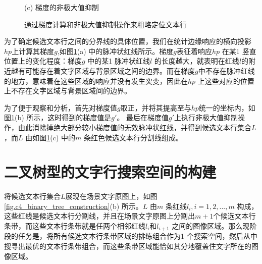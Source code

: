 \begin{figure}[!h]
\begin{minipage}[t]{0.32\linewidth}
        \centerline{\small (c) 梯度的非极大值抑制}
        \end{minipage}
        \caption{通过梯度计算和非极大值抑制操作来粗略定位文本行}
        \label{fig.c4_candidate_line_construction}
        \end{figure}

        为了确定候选文本行之间的分界线的具体位置，我们在统计边缘响应的横向投影$hp$上计算其梯度$g$,如图\ref{fig.c4_candidate_line_construction}(a) 中的脉冲状红线所示。梯度$g$表征着响应$hp$ 在某1 竖直位置上的变化程度：梯度$g$ 中的某1 脉冲状红线$l$ 的长度越大，就表明在红线$l$的附近越有可能存在着文字区域与背景区域之间的边界。而在梯度$g$中不存在脉冲红线的地方，意味着在这些区域的响应并没有发生突变，因此在$hp$ 上这些对应的位置上不存在文字区域与背景区域间的边界。

        为了便于观察和分析，首先对梯度值$g$取正，并将其提高至与$hp$统一的坐标内，如图\ref{fig.c4_candidate_line_construction}(b) 所示，这时得到的梯度值是$g$$'$。 最后在梯度值$g$$'$上执行非极大值抑制操作，由此消除掉绝大部分较小梯度值的无效脉冲状红线，并得到候选文本行集合$L$，而$L$ 由如图\ref{fig.c4_candidate_line_construction}(c) 中的$m$ 条红色候选文本行分割线组成。

    \section{二叉树型的文字行搜索空间的构建}

    将候选文本行集合$L$展现在场景文字原图上，如图\ref{fig.c4_binary_tree_construction}(b) 所示。$L$ 由$m$ 条红线$l_i, i=1,2,...,m$ 构成，这些红线是候选文本行分割线，并且在场景文字原图上分割出$m+1$个候选文本行条带，而这些文本行条带就是任两个相邻红线$l_i$和$l_{i+1}$ 之间的图像区域。那么现阶段的任务是，将所有候选文本行条带区域的排练组合作为1 个搜索空间，然后从中搜寻出最优的文本行条带组合，而这些条带区域能恰如其分地覆盖住文字所在的图像区域。

